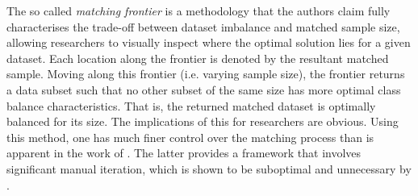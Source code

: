 {{The so called {\it matching frontier} is a methodology that the authors claim fully characterises the trade-off between dataset imbalance and matched sample size, allowing researchers to visually inspect where the optimal solution lies for a given dataset. Each location along the frontier is denoted by the resultant matched sample. Moving along this frontier (i.e. varying sample size), the frontier returns a data subset such that no other subset of the same size has more optimal class balance characteristics. That is, the returned matched dataset is optimally balanced for its size. The implications of this for researchers are obvious. Using this method, one has much finer control over the matching process than is apparent in the work of  \cite{stuart2010matching}. The latter provides a framework that involves significant manual iteration, which is shown to be suboptimal and unnecessary by \cite{king2014balance}.}
}
